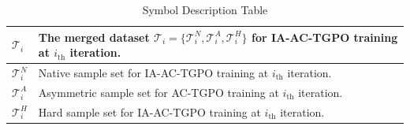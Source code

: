 \documentclass[11pt]{article}
\def\trainingmethod{AC-TGPO}
\begin{document}
\begin{table} [ht]
\begin{tabular}{|p{}|p{}|}
\hline
$\mathcal{T}_{i}$ & The merged dataset $\mathcal{T}_{i} = \{\mathcal{T}^{N}_{i}, \mathcal{T}^{A}_{i}, \mathcal{T}^{H}_{i}\}$ for IA-{\trainingmethod} training at $i_{\mathrm{th}}$ iteration. \\
\hline
$\mathcal{T}^{N}_{i}$ & Native sample set for IA-{\trainingmethod} training at $i_{\mathrm{th}}$ iteration. \\
\hline
$\mathcal{T}^{A}_{i}$ & Asymmetric sample set for {\trainingmethod} training at $i_{\mathrm{th}}$ iteration. \\
\hline
$\mathcal{T}^{H}_{i}$ & Hard sample set for IA-{\trainingmethod} training at $i_{\mathrm{th}}$ iteration. \\


\hline
\end{tabular}
\caption{Symbol Description Table}
\label{tab:symbol_description}
\end{table}
\end{document}
